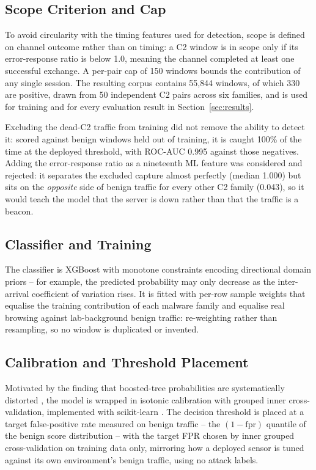 \documentclass[conference,a4paper]{IEEEtran}
\begin{document}
\subsection{Scope Criterion and Cap}\label{sec:scope}
To avoid circularity with the timing features used for detection, scope is defined on channel outcome rather than on timing: a C2 window is in scope only if its error-response ratio is below 1.0, meaning the channel completed at least one successful exchange. A per-pair cap of 150 windows bounds the contribution of any single session. The resulting corpus contains 55{,}844 windows, of which 330 are positive, drawn from 50 independent C2 pairs across six families, and is used for training and for every evaluation result in Section~\ref{sec:results}.

Excluding the dead-C2 traffic from training did not remove the ability to detect it: scored against benign windows held out of training, it is caught 100\% of the time at the deployed threshold, with ROC-AUC 0.995 against those negatives. Adding the error-response ratio as a nineteenth ML feature was considered and rejected: it separates the excluded capture almost perfectly (median 1.000) but sits on the \emph{opposite} side of benign traffic for every other C2 family (0.043), so it would teach the model that the server is down rather than that the traffic is a beacon.

\subsection{Classifier and Training}
The classifier is XGBoost \cite{chen2016xgboost} with monotone constraints encoding directional domain priors -- for example, the predicted probability may only decrease as the inter-arrival coefficient of variation rises. It is fitted with per-row sample weights that equalise the training contribution of each malware family and equalise real browsing against lab-background benign traffic: re-weighting rather than resampling, so no window is duplicated or invented.

\subsection{Calibration and Threshold Placement}\label{sec:calibration}
Motivated by the finding that boosted-tree probabilities are systematically distorted \cite{niculescumizil2005predicting}, the model is wrapped in isotonic calibration with grouped inner cross-validation, implemented with scikit-learn \cite{pedregosa2011scikit}. The decision threshold is placed at a target false-positive rate measured on benign traffic -- the \((1-\mathrm{fpr})\) quantile of the benign score distribution -- with the target FPR chosen by inner grouped cross-validation on training data only, mirroring how a deployed sensor is tuned against its own environment's benign traffic, using no attack labels.
\end{document}

